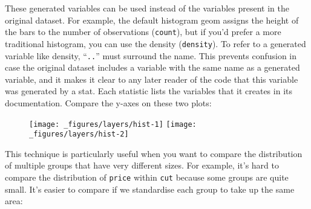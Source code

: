 These generated variables can be used instead of the variables present
in the original dataset. For example, the default histogram geom assigns
the height of the bars to the number of observations (\texttt{count}),
but if you'd prefer a more traditional histogram, you can use the
density (\texttt{density}). To refer to a generated variable like
density, ``\texttt{..}'' must surround the name. This prevents confusion
in case the original dataset includes a variable with the same name as a
generated variable, and it makes it clear to any later reader of the
code that this variable was generated by a stat. Each statistic lists
the variables that it creates in its documentation.  Compare
the y-axes on these two plots:

\begin{Shaded}
\begin{Highlighting}[]
\StringTok{ }
\StringTok{  }\NormalTok{(} \NormalTok{)}
\StringTok{ }
\StringTok{  }\NormalTok{(}\NormalTok{(}  \NormalTok{)}
\end{Highlighting}
\end{Shaded}

\begin{figure}[H]
  \texttt{[image: \_figures/layers/hist-1]}%
  \texttt{[image: \_figures/layers/hist-2]}
\end{figure}

This technique is particularly useful when you want to compare the
distribution of multiple groups that have very different sizes. For
example, it's hard to compare the distribution of \texttt{price} within
\texttt{cut} because some groups are quite small. It's easier to compare
if we standardise each group to take up the same area:

\begin{Shaded}
\begin{Highlighting}[]
 \StringTok{ }
\StringTok{  }\NormalTok{(} \NormalTok{) +}
\StringTok{  }\NormalTok{(} \NormalTok{)}

 \StringTok{ }
\StringTok{  }\NormalTok{(}\NormalTok{(}  \NormalTok{) +}\StringTok{ }
\StringTok{  }\NormalTok{(} \NormalTok{)}
\end{Highlighting}
\end{Shaded}

